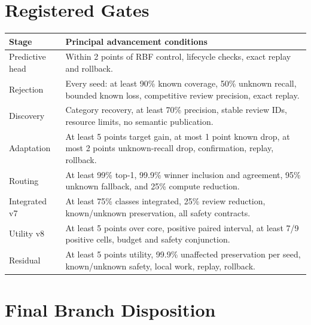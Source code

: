 \documentclass[12pt,oneside]{report}
\begin{document}
\appendix

\chapter{Registered Gates}

\begin{longtable}{
>{\raggedright\arraybackslash}p{1.1in}
>{\raggedright\arraybackslash}p{4.4in}}
\toprule
\textbf{Stage} & \textbf{Principal advancement conditions}\\
\midrule
\endhead
Predictive head & Within 2 points of RBF control, lifecycle checks, exact replay
and rollback.\\
Rejection & Every seed: at least 90\% known coverage, 50\% unknown recall,
bounded known loss, competitive review precision, exact replay.\\
Discovery & Category recovery, at least 70\% precision, stable review IDs,
resource limits, no semantic publication.\\
Adaptation & At least 5 points target gain, at most 1 point known drop, at most
2 points unknown-recall drop, confirmation, replay, rollback.\\
Routing & At least 99\% top-1, 99.9\% winner inclusion and agreement, 95\%
unknown fallback, and 25\% compute reduction.\\
Integrated v7 & At least 75\% classes integrated, 25\% review reduction,
known/unknown preservation, all safety contracts.\\
Utility v8 & At least 5 points over core, positive paired interval, at least
7/9 positive cells, budget and safety conjunction.\\
Residual & At least 5 points utility, 99.9\% unaffected preservation per seed,
known/unknown safety, local work, replay, rollback.\\
\bottomrule
\end{longtable}

\chapter{Final Branch Disposition}
\end{document}
